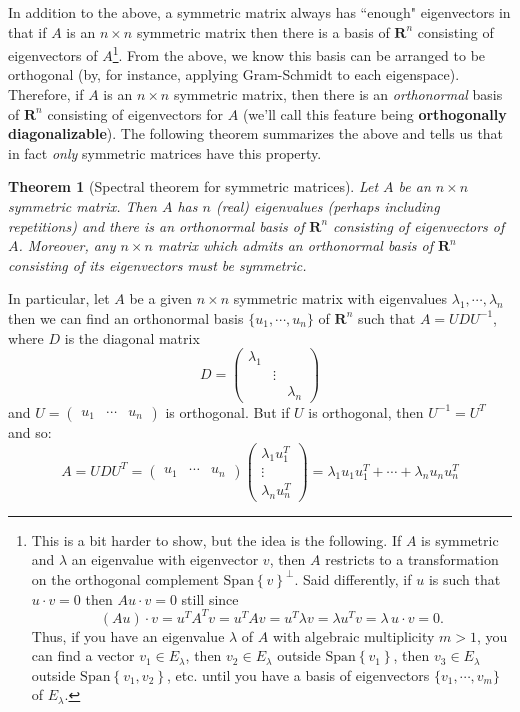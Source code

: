 \documentclass[12pt]{article}
\numberwithin{equation}{subsection}
\numberwithin{figure}{subsection}
\newtheorem{thm}[subsection]{Theorem}
\theoremstyle{note}
\newcommand{\R}{\mathbf{R}}
\newcommand\Span[1]{\mathrm{Span}\left\{#1\right\}}
\newcommand\m[1]{\begin{pmatrix}#1\end{pmatrix}}
\begin{document}
In addition to the above, a symmetric matrix always has ``enough" eigenvectors in that if $A$ is an $n\times n$ symmetric matrix then there is a basis of $\R^n$ consisting of eigenvectors of $A$\footnote{This is a bit harder to show, but the idea is the following. If $A$ is symmetric and $\lambda$ an eigenvalue with eigenvector $v$, then $A$ restricts to a transformation on the orthogonal complement $\Span{v}^{\perp}$. Said differently, if $u$ is such that $u\cdot v=0$ then $Au\cdot v=0$ still since \[ (Au)\cdot v=u^TA^Tv=u^TAv=u^T\lambda v=\lambda u^Tv=\lambda\, u\cdot v=0.\] Thus, if you have an eigenvalue $\lambda$ of $A$ with algebraic multiplicity $m>1$, you can find a vector $v_1 \in E_{\lambda}$, then $v_2\in E_{\lambda}$ outside $\Span{v_1}$, then $v_3\in E_{\lambda}$ outside $\Span{v_1,v_2}$, etc. until you have a basis of eigenvectors $\{v_1,\cdots,v_m\}$ of $E_{\lambda}$.}. From the above, we know this basis can be arranged to be orthogonal (by, for instance, applying Gram-Schmidt to each eigenspace). Therefore, if $A$ is an $n\times n$ symmetric matrix, then there is an \textit{orthonormal} basis of $\R^n$ consisting of eigenvectors for $A$ (we'll call this feature being \textbf{orthogonally diagonalizable}). The following theorem summarizes the above and tells us that in fact \textit{only} symmetric matrices have this property.

\begin{thm}[Spectral theorem for symmetric matrices] \label{thm-sym-matrix}
	Let $A$ be an $n\times n$ symmetric matrix. Then $A$ has $n$ (real) eigenvalues (perhaps including repetitions) and  there is an orthonormal basis of $\R^n$ consisting of eigenvectors of $A$. Moreover, any $n\times n$ matrix which admits an orthonormal basis of $\R^n$ consisting of its eigenvectors must be symmetric.
\end{thm}

In particular, let $A$ be a given $n\times n$ symmetric matrix with eigenvalues $\lambda_1,\cdots,\lambda_n$ then we can find an orthonormal basis $\{u_1,\cdots,u_n\}$ of $\R^n$ such that $A=UDU^{-1}$, where $D$ is the diagonal matrix \[ D=\m{\lambda_1 && \\ & \vdots & \\ && \lambda_n}\] and $U=\m{u_1 & \cdots & u_n}$ is orthogonal. But if $U$ is orthogonal, then $U^{-1}=U^T$ and so:  \begin{equation} \label{eq-spec0} A=UDU^T=\m{u_1 & \cdots & u_n} \m{\lambda_1 u_1^T \\  \vdots \\  \lambda_n u_n^T}=\lambda_1 u_1u_1^T + \cdots + \lambda_n u_nu_n^T\end{equation}
\end{document}
